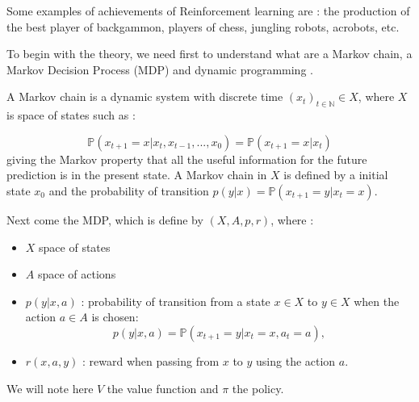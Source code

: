 \documentclass[conference]{IEEEtran}
\begin{document}
Some examples of achievements of Reinforcement learning are : the production of the best player of backgammon, players of chess, jungling robots, acrobots, etc.

To begin with the theory, we need first to understand what are a Markov chain, a Markov Decision Process (MDP) and dynamic programming \cite{MUNOS1}.

A Markov chain is a dynamic system with discrete time $(x_t)_{t\in\mathbb{N}} \in X$, where $X$ is space of states such as :

\begin{equation*}
\mathbb{P}(x_{t+1}=x|x_t,x_{t-1},...,x_0)=\mathbb{P}(x_{t+1}=x|x_t)
\end{equation*}
giving the Markov property that all the useful information for the future prediction is in the present state. A Markov chain in $X$ is defined by a initial state $x_0$ and the probability of transition $p(y|x)=\mathbb{P}(x_{t+1}=y|x_t=x)$.

Next come the MDP, which is define by $(X,A,p,r)$, where :
\begin{itemize}
 \item $X$ space of states
 \item $A$ space of actions
 \item $p(y|x,a)$ : probability of transition from a state $x \in X$ to $y \in X$ when the action $a \in A$ is chosen:
 \begin{equation*}
 p(y|x,a) = \mathbb{P}(x_{t+1}=y|x_t=x,a_t=a),
 \end{equation*}
 \item $r(x,a,y)$ : reward when passing from $x$ to $y$ using the action $a$.
\end{itemize}
We will note here $V$ the value function and $\pi$ the policy.\\
\end{document}

